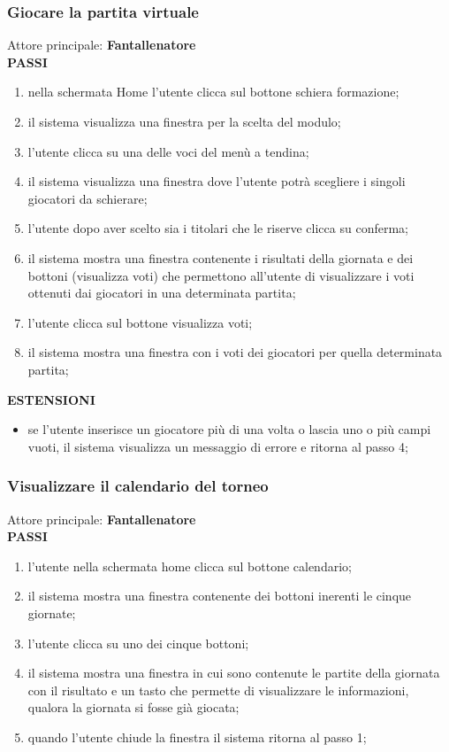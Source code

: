 \documentclass[12pt,a4paper]{article}
\begin{document}
\subsubsection{Giocare la partita virtuale}
Attore principale: \textbf{Fantallenatore}\\
\newline
\textbf{PASSI}
\begin{enumerate}
\item nella schermata Home l'utente clicca sul bottone schiera formazione;
\item il sistema visualizza una finestra per la scelta del modulo;
\item l'utente clicca su una delle voci del menù a tendina;
\item il sistema visualizza una finestra dove l'utente potrà scegliere i singoli giocatori da schierare;
\item l'utente dopo aver scelto sia i titolari che le riserve clicca su conferma;
\item il sistema mostra una finestra contenente i risultati della giornata e dei bottoni (visualizza voti) che permettono all'utente di visualizzare i voti ottenuti dai giocatori in una determinata partita;
\item l'utente clicca sul bottone visualizza voti;
\item il sistema mostra una finestra con i voti dei giocatori per quella determinata partita;
\end{enumerate}
\textbf{ESTENSIONI}
\begin{itemize}
\item se l'utente inserisce un giocatore più di una volta o lascia uno o più campi vuoti, il sistema visualizza un messaggio di errore e ritorna al passo 4;
\end{itemize}
\subsubsection{Visualizzare il calendario del torneo}
Attore principale: \textbf{Fantallenatore}\\
\newline
\textbf{PASSI}
\begin{enumerate}
\item l'utente nella schermata home clicca sul bottone calendario;
\item il sistema mostra una finestra contenente dei bottoni inerenti le cinque giornate;
\item l'utente clicca su uno dei cinque bottoni;
\item il sistema mostra una finestra in cui sono contenute le partite della giornata con il risultato e un tasto che permette di visualizzare le informazioni, qualora la giornata si fosse già giocata;
\item quando l'utente chiude la finestra il sistema ritorna al passo 1;
\end{enumerate}
\end{document}
